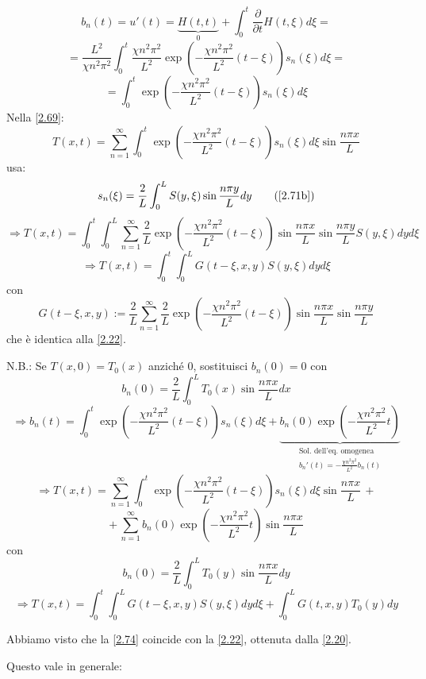 \documentclass[a4paper,11pt]{report}
\begin{document}
\[
b_n(t) = u'(t) = \underbrace{H(t,t)}_{0} + \int_0^t \frac{\partial}{\partial t}H(t,\xi)d\xi = 
\]
\[
=\frac{L^2}{\chi n^2\pi^2}\int_0^t \frac{\chi n^2 \pi^2}{L^2}\exp \left(-\frac{\chi n^2 \pi^2}{L^2}(t-\xi)\right) s_n(\xi)d\xi =
\]
\[
=\int_0^t \exp \left(-\frac{\chi n^2 \pi^2}{L^2}(t-\xi)\right) s_n(\xi)d\xi
\]
Nella \eqref{2.69}:
\[
T(x,t)=\sum_{n=1}^{\infty}\int_0^t\exp \left(-\frac{\chi n^2 \pi^2}{L^2}(t-\xi)\right) s_n(\xi)d\xi \sin\frac{n\pi x}{L}
\]
usa:
\begin{equation}
s_n(\xi)=\frac{2}{L}\int_0^L S(y,\xi) \sin \frac{n\pi y}{L}dy
\tag{\ref{2.71b}}
\end{equation}
\[
\Rightarrow T(x,t)=\int_0^t \int_0^L \sum_{n=1}^{\infty}\frac{2}{L}\exp \left(-\frac{\chi n^2 \pi^2}{L^2}(t-\xi)\right) \sin \frac{n\pi x}{L}\sin \frac{n\pi y}{L} S(y,\xi)dyd\xi
\]
\begin{equation}
\Rightarrow T(x,t)=\int_0^t \int_0^L G(t-\xi,x,y)S(y,\xi)dyd\xi
\end{equation}
con
\begin{equation}
G(t-\xi,x,y):=\frac{2}{L}\sum_{n=1}^{\infty}\frac{2}{L}\exp \left(-\frac{\chi n^2 \pi^2}{L^2}(t-\xi)\right) \sin \frac{n\pi x}{L}\sin \frac{n\pi y}{L}
\label{2.74}
\end{equation}
che \`e identica alla \eqref{2.22}.

\medskip

N.B.: Se $T(x,0)=T_0(x)$ anzich\'e 0, sostituisci $ b_n(0)=0$ con
\[
b_n(0)=\frac{2}{L}\int_0^L T_0(x)\sin\frac{n\pi x}{L}dx
\]
\[
\Rightarrow b_n(t)=\int_0^t\exp\left(-\frac{\chi n^2 \pi^2}{L^2}(t-\xi)\right)s_n(\xi)d\xi + \underbrace{b_n(0)\exp\left(-\frac{\chi n^2 \pi^2}{L^2}t\right)}_{\substack{\text{Sol. dell'eq. omogenea} \\ b_n'(t)=-\frac{\chi n^2 \pi^2}{L^2}b_n(t)}}
\]
\[
\Rightarrow T(x,t) = \sum_{n=1}^\infty \int_0^t\exp\left(-\frac{\chi n^2 \pi^2}{L^2}(t-\xi)\right)s_n(\xi)d\xi\sin\frac{n\pi x}{L}\,+
\]
\[
+\,\sum_{n=1}^\infty b_n(0)\exp\left(-\frac{\chi n^2 \pi^2}{L^2}t\right)\sin\frac{n\pi x}{L}
\]
con
\[
b_n(0)=\frac{2}{L}\int^L_0 T_0(y)\sin\frac{n\pi x}{L}dy
\]
\begin{equation}
\Rightarrow T(x,t)=\int_0^t \int_0^L G(t-\xi,x,y)S(y,\xi)dyd\xi + \int_0^L G(t,x,y)T_0(y)dy
\end{equation}

Abbiamo visto che la \eqref{2.74} coincide con la \eqref{2.22}, ottenuta dalla \eqref{2.20}. 

\medskip

Questo vale in generale: 
\end{document}
